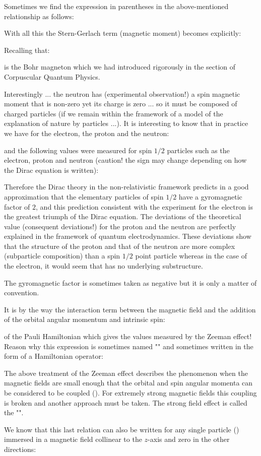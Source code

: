 	Sometimes we find the expression in parentheses in the above-mentioned relationship as follows:
	
	With all this the Stern-Gerlach term (magnetic moment) becomes explicitly:
	
	Recalling that:
	
	is the Bohr magneton which we had introduced rigorously in the section of Corpuscular Quantum Physics.
	
	Interestingly ... the neutron has (experimental observation!) a spin magnetic moment that is non-zero yet its charge is zero ... so it must be composed of charged particles (if we remain within the framework of a model of the explanation of nature by particles ...). It is interesting to know that in practice we have for the electron, the proton and the neutron:
	
	and the following values were measured for spin $1/2$ particles such as the electron, proton and neutron (caution! the sign may change depending on how the Dirac equation is written):
	
	Therefore the Dirac theory in the non-relativistic framework predicts in a good approximation that the elementary particles of spin $1/2$ have a gyromagnetic factor of $2$, and this prediction consistent with the experiment for the electron is the greatest triumph of the Dirac equation. The deviations of the theoretical value (consequent deviations!) for the proton and the neutron are perfectly explained in the framework of quantum electrodynamics. These deviations show that the structure of the proton and that of the neutron are more complex (subparticle composition) than a spin $1/2$ point particle whereas in the case of the electron, it would seem that has no underlying substructure.
	\begin{tcolorbox}[title=Remark,colframe=black,arc=10pt]
	The gyromagnetic factor is sometimes taken as negative but it is only a matter of convention.
	\end{tcolorbox}
	It is by the way the interaction term between the magnetic field and the addition of the orbital angular momentum and intrinsic spin:
	
	of the Pauli Hamiltonian which gives the values measured by the Zeeman effect! Reason why this expression is sometimes named "" and sometimes written in the form of a Hamiltonian operator:
	
	\begin{tcolorbox}[title=Remark,colframe=black,arc=10pt]
	The above treatment of the Zeeman effect describes the phenomenon when the magnetic fields are small enough that the orbital and spin angular momenta can be considered to be coupled (). For extremely strong magnetic fields this coupling is broken and another approach must be taken. The strong field effect is called the "".
	\end{tcolorbox}
	We know that this last relation can also be written for any single particle () immersed in a magnetic field collinear to the $z$-axis and zero in the other directions:
	
